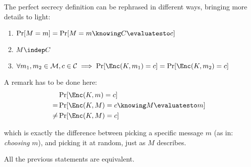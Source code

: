 The perfect secrecy definition can be rephrased in different ways, bringing more details to light:
\begin{enumerate}
    \item $\Pr[M = m] = \Pr[M = m \knowing C \evaluatesto c]$
    \item $M \indep C$
    \item $\forall m_1, m_2 \in \M, c \in \C \implies \Pr[\Enc(K, m_1) = c] = \Pr[\Enc(K, m_2) = c]$
\end{enumerate}

A remark has to be done here:
\begin{align*}
    & \Pr[\Enc(K, m) = c] \\
    =& \Pr[\Enc(K, M) = c \knowing M \evaluatesto m] \\
    \neq& \Pr[\Enc(K, M) = c]
\end{align*}

which is exactly the difference between picking a specific message $m$ (as in: \emph{choosing} $m$), and picking it at random, just as $M$ describes.
    
\begin{proposition}
    All the previous statements are equivalent.
\end{proposition}

